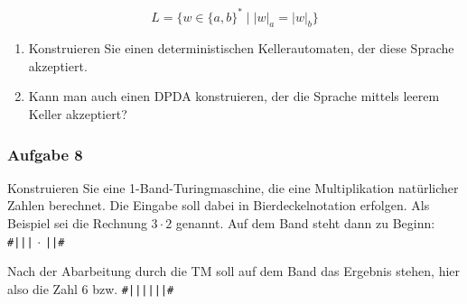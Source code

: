 \documentclass[a4paper,14pt,ngerman]{scrartcl}
\begin{document}
\[L=\{w \in \{a,b\}^* \mid |w|_a=|w|_b\}\]

\begin{enumerate}
\item Konstruieren Sie einen deterministischen Kellerautomaten, der diese
Sprache akzeptiert.

\item Kann man auch einen DPDA konstruieren, der die Sprache mittels leerem
Keller akzeptiert?
\end{enumerate}
\subsubsection{\textbf{Aufgabe 8}}
\label{sec:orga28b37d}

Konstruieren Sie eine 1-Band-Turingmaschine, die eine Multiplikation
natürlicher Zahlen berechnet. Die Eingabe soll dabei in
Bierdeckelnotation erfolgen. Als Beispiel sei die Rechnung \(3\cdot2\)
genannt. Auf dem Band steht dann zu Beginn: \texttt{\#|||} \(\cdot\) \texttt{||\#}

Nach der Abarbeitung durch die TM soll auf dem Band das Ergebnis stehen,
hier also die Zahl \(6\) bzw. \texttt{\#||||||\#}
\end{document}
